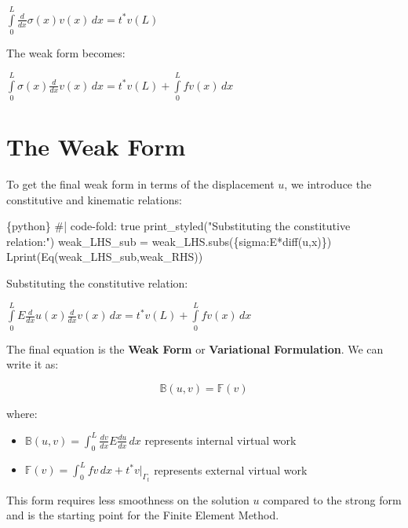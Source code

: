 \documentclass[
  11pt,
  a4paper,
]{scrbook}
\newenvironment{Shaded}{\begin{snugshade}}{\end{snugshade}}
\newcommand{\InformationTok}[1]{\textcolor[rgb]{0.37,0.37,0.37}{#1}}
\providecommand{\tightlist}{%
  \setlength{\itemsep}{0pt}\setlength{\parskip}{0pt}}\usepackage{longtable,booktabs,array}
\begin{document}
$\displaystyle \int\limits_{0}^{L} \frac{d}{d x} \sigma{\left(x \right)} v{\left(x \right)}\, dx = t^{*} v{\left(L \right)}$

The weak form becomes:

$\displaystyle \int\limits_{0}^{L} \sigma{\left(x \right)} \frac{d}{d x} v{\left(x \right)}\, dx = t^{*} v{\left(L \right)} + \int\limits_{0}^{L} f v{\left(x \right)}\, dx$

\section{The Weak Form}\label{the-weak-form}

To get the final weak form in terms of the displacement \(u\), we
introduce the constitutive and kinematic relations:

\begin{Shaded}
\begin{Highlighting}[]
\InformationTok{\textasciigrave{}\textasciigrave{}\textasciigrave{}\{python\}}
\InformationTok{\#| code{-}fold: true}
\InformationTok{print\_styled("Substituting the constitutive relation:")}
\InformationTok{weak\_LHS\_sub = weak\_LHS.subs(\{sigma:E*diff(u,x)\})}
\InformationTok{Lprint(Eq(weak\_LHS\_sub,weak\_RHS))}
\InformationTok{\textasciigrave{}\textasciigrave{}\textasciigrave{}}
\end{Highlighting}
\end{Shaded}

Substituting the constitutive relation:

$\displaystyle \int\limits_{0}^{L} E \frac{d}{d x} u{\left(x \right)} \frac{d}{d x} v{\left(x \right)}\, dx = t^{*} v{\left(L \right)} + \int\limits_{0}^{L} f v{\left(x \right)}\, dx$

The final equation is the \textbf{Weak Form} or \textbf{Variational
Formulation}. We can write it as:

\[\mathbb{B}(u,v) = \mathbb{F}(v)\]

where:

\begin{itemize}
\tightlist
\item
  \(\mathbb{B}(u,v) = \int_0^L \frac{dv}{dx} E \frac{du}{dx} \, dx\)
  represents internal virtual work
\item
  \(\mathbb{F}(v) = \int_0^L f v \, dx + t^* v|_{\Gamma_t}\) represents
  external virtual work
\end{itemize}

This form requires less smoothness on the solution \(u\) compared to the
strong form and is the starting point for the Finite Element Method.
\end{document}
